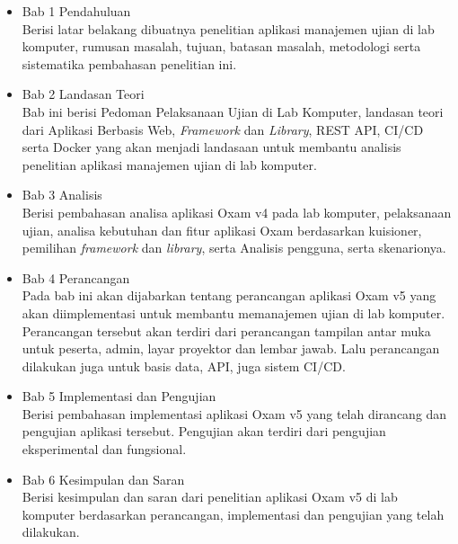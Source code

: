 \begin{itemize}
    \item Bab 1 Pendahuluan \\
        Berisi latar belakang dibuatnya penelitian aplikasi manajemen ujian di lab komputer, 
        rumusan masalah, tujuan, batasan masalah, metodologi serta sistematika pembahasan penelitian ini.
    
    \item Bab 2 Landasan Teori \\
        Bab ini berisi Pedoman Pelaksanaan Ujian di Lab Komputer, landasan
        teori dari Aplikasi Berbasis Web, \textit{Framework} dan
        \textit{Library}, REST API, CI/CD serta Docker yang akan menjadi
        landasaan untuk membantu analisis penelitian aplikasi manajemen ujian di
        lab komputer.
        
    \item Bab 3 Analisis \\
        Berisi pembahasan analisa aplikasi Oxam v4 pada lab komputer,
        pelaksanaan ujian, analisa kebutuhan dan fitur aplikasi Oxam berdasarkan
        kuisioner, pemilihan \textit{framework} dan \textit{library}, serta
        Analisis pengguna, serta skenarionya.
        
    \item Bab 4 Perancangan \\
        Pada bab ini akan dijabarkan tentang perancangan aplikasi Oxam v5 yang akan
        diimplementasi untuk membantu memanajemen ujian di lab komputer.
        Perancangan tersebut akan terdiri dari perancangan tampilan antar muka
        untuk peserta, admin, layar proyektor dan lembar jawab. Lalu perancangan
        dilakukan juga untuk basis data, API, juga sistem CI/CD.
    
    \item Bab 5 Implementasi dan Pengujian \\
        Berisi pembahasan implementasi aplikasi Oxam v5 yang telah dirancang dan
        pengujian aplikasi tersebut. Pengujian akan terdiri dari pengujian
        eksperimental dan fungsional.
        
    \item Bab 6 Kesimpulan dan Saran \\
        Berisi kesimpulan dan saran dari penelitian aplikasi Oxam v5 di
        lab komputer berdasarkan perancangan, implementasi dan pengujian yang
        telah dilakukan.
\end{itemize}